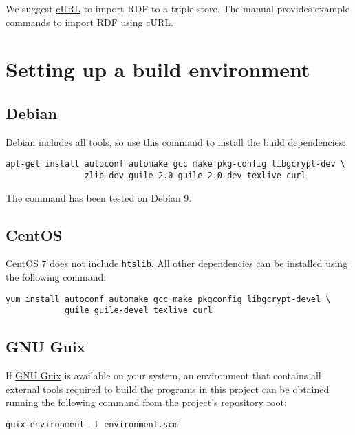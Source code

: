   We suggest \href{https://curl.haxx.se/}{cURL} to import RDF to a triple
  store.  The manual provides example commands to import RDF using cURL.

\section{Setting up a build environment}

\subsection{Debian}

  Debian includes all tools, so use this command to install the
  build dependencies:

\begin{siderules}
\begin{verbatim}
apt-get install autoconf automake gcc make pkg-config libgcrypt-dev \
                zlib-dev guile-2.0 guile-2.0-dev texlive curl
\end{verbatim}
\end{siderules}

  The command has been tested on Debian 9.

\subsection{CentOS}

  CentOS 7 does not include \texttt{htslib}.  All other dependencies can
  be installed using the following command:

\begin{siderules}
\begin{verbatim}
yum install autoconf automake gcc make pkgconfig libgcrypt-devel \
            guile guile-devel texlive curl
\end{verbatim}
\end{siderules}

\subsection{GNU Guix}

  If \href{https://www.gnu.org/software/guix}{GNU Guix} is available on your
  system, an environment that contains all external tools required to build
  the programs in this project can be obtained running the following command
  from the project's repository root:

\begin{siderules}
\begin{verbatim}
guix environment -l environment.scm
\end{verbatim}
\end{siderules}

